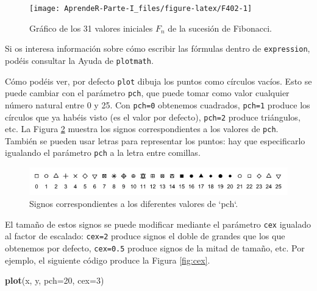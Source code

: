 \documentclass[]{book}
\newenvironment{Shaded}{\begin{snugshade}}{\end{snugshade}}
\newcommand{\DataTypeTok}[1]{\textcolor[rgb]{0.13,0.29,0.53}{#1}}
\newcommand{\DecValTok}[1]{\textcolor[rgb]{0.00,0.00,0.81}{#1}}
\newcommand{\KeywordTok}[1]{\textcolor[rgb]{0.13,0.29,0.53}{\textbf{#1}}}
\newcommand{\NormalTok}[1]{#1}
\theoremstyle{definition}
\theoremstyle{definition}
\theoremstyle{definition}
\theoremstyle{remark}
\begin{document}
\begin{figure}

{\centering \texttt{[image: AprendeR-Parte-I\_files/figure-latex/F402-1]} 

}

\caption{Gráfico de los 31 valores iniciales $F_n$ de la sucesión de Fibonacci.}\label{fig:F402}
\end{figure}

Si os interesa información sobre cómo escribir las fórmulas dentro de \texttt{expression}, podéis consultar la Ayuda de \texttt{plotmath}.

Cómo podéis ver, por defecto \texttt{plot} dibuja los puntos como círculos vacíos. Esto se puede cambiar con el parámetro \texttt{pch}, que puede tomar como valor cualquier número natural entre 0 y 25. Con \texttt{pch=0} obtenemos cuadrados, \texttt{pch=1} produce los círculos que ya habéis visto (es el valor por defecto), \texttt{pch=2} produce triángulos, etc. La Figura
\ref{fig:F403} muestra los signos correspondientes a los valores de \texttt{pch}. También se pueden usar letras para representar los puntos: hay que especificarlo igualando el parámetro \texttt{pch} a la letra entre comillas.

\begin{figure}

{\centering \includegraphics{AprendeR-Parte-I_files/figure-html/pchh} 

}

\caption{Signos correspondientes a los diferentes valores de `pch`.}\label{fig:F403}
\end{figure}

El tamaño de estos signos se puede modificar mediante el parámetro \texttt{cex} igualado al factor de escalado: \texttt{cex=2} produce signos el doble de grandes que los que obtenemos por defecto, \texttt{cex=0.5} produce signos de la mitad de tamaño, etc. Por ejemplo, el siguiente código produce la Figura \ref{fig:cex}.

\begin{Shaded}
\begin{Highlighting}[]
\KeywordTok{plot}\NormalTok{(x, y, }\DataTypeTok{pch=}\DecValTok{20}\NormalTok{, }\DataTypeTok{cex=}\DecValTok{3}\NormalTok{)}
\end{Highlighting}
\end{Shaded}
\end{document}
